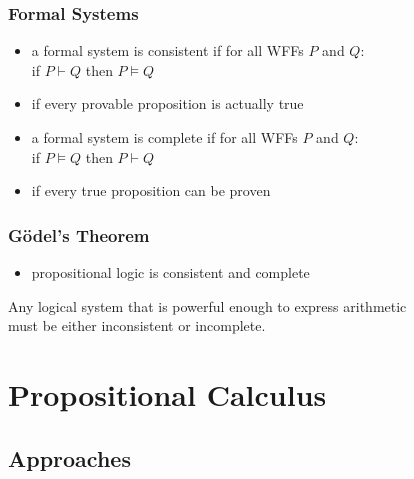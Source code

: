 \documentclass[dvipsnames]{beamer}
\begin{document}
\begin{frame}
  \frametitle{Formal Systems}

  \begin{itemize}
    \item a formal system is \alert{consistent} if for all WFFs $P$ and $Q$:\\
      if $P \vdash Q$ then $P \vDash Q$
    \item if every provable proposition is actually true

    \pause
    \bigskip
    \item a formal system is \alert{complete} if for all WFFs $P$ and $Q$:\\
        if $P \vDash Q$ then $P \vdash Q$
    \item if every true proposition can be proven
  \end{itemize}
\end{frame}

\begin{frame}
  \frametitle{Gödel's Theorem}

  \begin{itemize}
    \item propositional logic is consistent and complete
  \end{itemize}

  \pause
  \bigskip
  \begin{theorem}
    Any logical system that is powerful enough to express arithmetic\\
    must be either inconsistent or incomplete.
  \end{theorem}

\end{frame}

\section{Propositional Calculus}

\subsection{Approaches}
\end{document}
